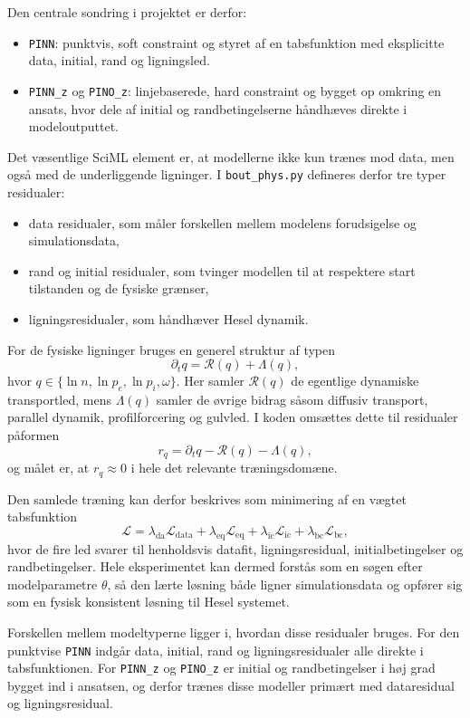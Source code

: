 Den centrale sondring i projektet er derfor:
\begin{itemize}
    \item \texttt{PINN}: punktvis, soft constraint og styret af en tabsfunktion med eksplicitte data, initial, rand og ligningsled.
    \item \texttt{PINN\_z} og \texttt{PINO\_z}: linjebaserede, hard constraint og bygget op omkring en ansats, hvor dele af initial og randbetingelserne håndhæves direkte i modeloutputtet.
\end{itemize}

Det væsentlige SciML element er, at modellerne ikke kun trænes mod data, men også med de underliggende ligninger. I \texttt{bout\_phys.py} defineres derfor tre typer residualer:
\begin{itemize}
    \item data residualer, som måler forskellen mellem modelens forudsigelse og simulationsdata,
    \item rand og initial residualer, som tvinger modellen til at respektere start tilstanden og de fysiske grænser,
    \item ligningsresidualer, som håndhæver Hesel dynamik.
\end{itemize}

For de fysiske ligninger bruges en generel struktur af typen
\[
\partial_t q = \mathcal{R}(q) + \Lambda(q),
\]
hvor \(q\in\{\ln n,\ln p_e,\ln p_i,\omega\}\). Her samler \(\mathcal{R}(q)\) de egentlige dynamiske transportled, mens \(\Lambda(q)\) samler de øvrige bidrag såsom diffusiv transport, parallel dynamik, profilforcering og gulvled. I koden omsættes dette til residualer påformen
\[
r_q = \partial_t q - \mathcal{R}(q) - \Lambda(q),
\]
og målet er, at \(r_q\approx 0\) i hele det relevante træningsdomæne.

Den samlede træning kan derfor beskrives som minimering af en vægtet tabsfunktion
\[
\mathcal{L}
=
\lambda_{\mathrm{da}}\mathcal{L}_{\mathrm{data}}
+ \lambda_{\mathrm{eq}}\mathcal{L}_{\mathrm{eq}}
+ \lambda_{\mathrm{ic}}\mathcal{L}_{\mathrm{ic}}
+ \lambda_{\mathrm{bc}}\mathcal{L}_{\mathrm{bc}},
\]
hvor de fire led svarer til henholdsvis datafit, ligningsresidual, initialbetingelser og randbetingelser. Hele eksperimentet kan dermed forstås som en søgen efter modelparametre \(\theta\), så den lærte løsning både ligner simulationsdata og opfører sig som en fysisk konsistent løsning til Hesel systemet.

Forskellen mellem modeltyperne ligger i, hvordan disse residualer bruges. For den punktvise \texttt{PINN} indgår data, initial, rand og ligningsresidualer alle direkte i tabsfunktionen. For \texttt{PINN\_z} og \texttt{PINO\_z} er initial og randbetingelser i høj grad bygget ind i ansatsen, og derfor trænes disse modeller primært med dataresidual og ligningsresidual.


